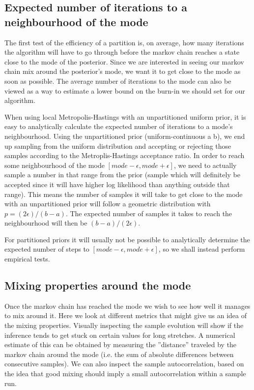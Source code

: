 \subsection{Expected number of iterations to a neighbourhood of the mode}
\label{section:sampsToMode}
The first test of the efficiency of a partition is, on average, how many iterations the algorithm will have to go through before the markov chain reaches a state close to the mode of the posterior. Since we are interested in seeing our markov chain mix around the posterior's mode, we want it to get close to the mode as soon as possible. The average number of iterations to the mode can also be viewed as a way to estimate a lower bound on the burn-in we should set for our algorithm.

When using local Metropolis-Hastings with an unpartitioned uniform prior, it is easy to analytically calculate the expected number of iterations to a mode's neighbourhood. Using the unpartitioned prior (uniform-continuous a b), we end up sampling from the uniform distribution and accepting or rejecting those samples according to the Metroplis-Hastings acceptance ratio. In order to reach some neighbourhood of the mode $[mode - \epsilon, mode + \epsilon]$, we need to actually sample a number in that range from the prior (sample which will definitely be accepted since it will have higher log likelihood than anything outside that range). This means the number of samples it will take to get close to the mode with an unpartitioned prior will follow a geometric distribution with $p = (2\epsilon)/(b-a)$. The expected number of samples it takes to reach the neighbourhood will then be $(b-a)/(2\epsilon)$.

For partitioned priors it will usually not be possible to analytically determine the expected number of steps to $[mode - \epsilon, mode + \epsilon]$, so we shall instead perform empirical tests.

\subsection{Mixing properties around the mode}
Once the markov chain has reached the mode we wish to see how well it manages to mix around it. Here we look at different metrics that might give us an idea of the mixing properties. Visually inspecting the sample evolution will show if the inference tends to get stuck on certain values for long stretches. A numerical estimate of this can be obtained by measuring the ''distance'' traveled by the markov chain around the mode (i.e. the sum of absolute differences between consecutive samples). We can also inspect the sample autocorrelation, based on the idea that good mixing should imply a small autocorrelation within a sample run.

